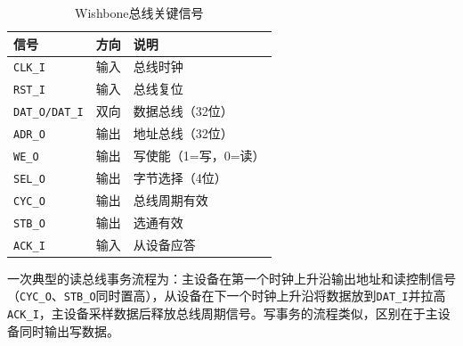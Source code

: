 \begin{table}[H]
    \centering
    \caption{Wishbone总线关键信号}
    \begin{tabular}{lll}
        \toprule
        \textbf{信号} & \textbf{方向} & \textbf{说明} \\
        \midrule
        \texttt{CLK\_I} & 输入 & 总线时钟 \\
        \texttt{RST\_I} & 输入 & 总线复位 \\
        \texttt{DAT\_O/DAT\_I} & 双向 & 数据总线（32位） \\
        \texttt{ADR\_O} & 输出 & 地址总线（32位） \\
        \texttt{WE\_O} & 输出 & 写使能（1=写，0=读） \\
        \texttt{SEL\_O} & 输出 & 字节选择（4位） \\
        \texttt{CYC\_O} & 输出 & 总线周期有效 \\
        \texttt{STB\_O} & 输出 & 选通有效 \\
        \texttt{ACK\_I} & 输入 & 从设备应答 \\
        \bottomrule
    \end{tabular}
\end{table}

一次典型的读总线事务流程为：主设备在第一个时钟上升沿输出地址和读控制信号（\texttt{CYC\_O}、\texttt{STB\_O}同时置高），从设备在下一个时钟上升沿将数据放到\texttt{DAT\_I}并拉高\texttt{ACK\_I}，主设备采样数据后释放总线周期信号。写事务的流程类似，区别在于主设备同时输出写数据。
